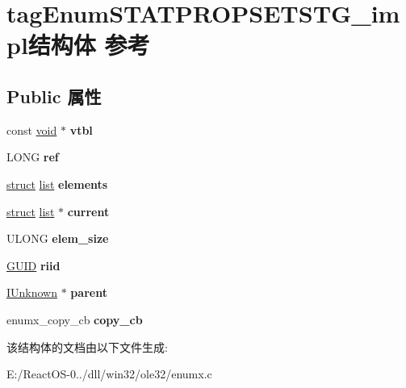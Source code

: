\hypertarget{structtag_enum_s_t_a_t_p_r_o_p_s_e_t_s_t_g__impl}{}\section{tag\+Enum\+S\+T\+A\+T\+P\+R\+O\+P\+S\+E\+T\+S\+T\+G\+\_\+impl结构体 参考}
\label{structtag_enum_s_t_a_t_p_r_o_p_s_e_t_s_t_g__impl}
\subsection*{Public 属性}
\begin{DoxyCompactItemize}
\item 
\mbox{\label{structtag_enum_s_t_a_t_p_r_o_p_s_e_t_s_t_g__impl_abcab2652e49d209245574b54fc917562}} 
const \hyperlink{interfacevoid}{void} $\ast$ {\bfseries vtbl}
\item 
\mbox{\label{structtag_enum_s_t_a_t_p_r_o_p_s_e_t_s_t_g__impl_a955e25eaacc09d3988d74f0beac794c9}} 
L\+O\+NG {\bfseries ref}
\item 
\mbox{\label{structtag_enum_s_t_a_t_p_r_o_p_s_e_t_s_t_g__impl_a18c4142847f3e59e864929c340b71468}} 
\hyperlink{interfacestruct}{struct} \hyperlink{classlist}{list} {\bfseries elements}
\item 
\mbox{\label{structtag_enum_s_t_a_t_p_r_o_p_s_e_t_s_t_g__impl_a3c8a888acde45dc11210ee867637fe16}} 
\hyperlink{interfacestruct}{struct} \hyperlink{classlist}{list} $\ast$ {\bfseries current}
\item 
\mbox{\label{structtag_enum_s_t_a_t_p_r_o_p_s_e_t_s_t_g__impl_af797f45886aa7f1b27fc0e104f9befa4}} 
U\+L\+O\+NG {\bfseries elem\+\_\+size}
\item 
\mbox{\label{structtag_enum_s_t_a_t_p_r_o_p_s_e_t_s_t_g__impl_a837192e4bb3ac13d4c64cd2cddc918d2}} 
\hyperlink{interface_g_u_i_d}{G\+U\+ID} {\bfseries riid}
\item 
\mbox{\label{structtag_enum_s_t_a_t_p_r_o_p_s_e_t_s_t_g__impl_a306b8d59bb191d5cde71ae77521736f2}} 
\hyperlink{interface_i_unknown}{I\+Unknown} $\ast$ {\bfseries parent}
\item 
\mbox{\label{structtag_enum_s_t_a_t_p_r_o_p_s_e_t_s_t_g__impl_a56f31ca5d2b87e57ca3e0e321d6090e3}} 
enumx\+\_\+copy\+\_\+cb {\bfseries copy\+\_\+cb}
\end{DoxyCompactItemize}


该结构体的文档由以下文件生成\+:\begin{DoxyCompactItemize}
\item 
E\+:/\+React\+O\+S-\/0../dll/win32/ole32/enumx.\+c\end{DoxyCompactItemize}
